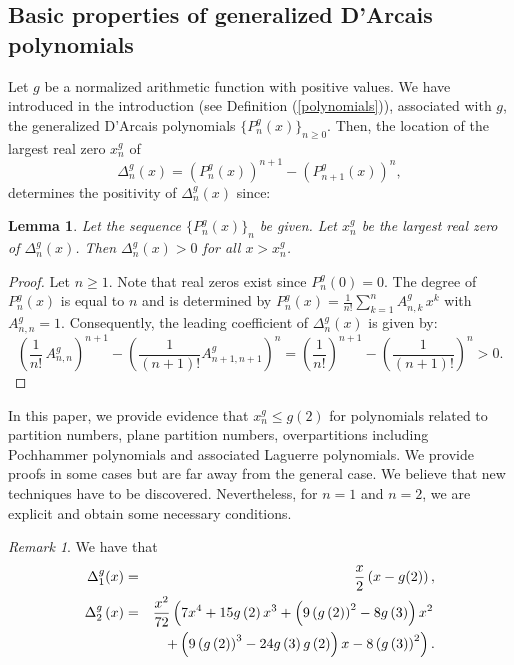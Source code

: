 \documentclass[11pt,reqno]{amsart}
\theoremstyle{plain}
\newtheorem{lemma}[theorem]{Lemma}
\theoremstyle{remark}
\newtheorem*{remark*}{Remark}
\theoremstyle{definition}
\numberwithin{equation}{section}
\begin{document}
\subsection{Basic
properties of
generalized D'Arcais
polynomials}
Let $g$ be a normalized arithmetic function with positive values.
We have introduced in the
introduction (see Definition (\ref{polynomials})),
associated with
$g$, the generalized D'Arcais polynomials $\{P_n^g(x)\}_{n\geq 0}$.
Then, the location of the largest real zero $x_n^g$ of
%
%
\begin{equation*}
\Delta_n^g(x)= \left(P_n^g(x)\right)^{n+1}-\left(P_{n+1}^g(x)\right)^n,
\end{equation*}
determines the positivity of $\Delta_n^g(x)$ since:
\begin{lemma}\label{lemma:largest}
Let the sequence $\{P_n^g(x)\}_n$ be given. Let $x_n^g$ be the largest real zero of $\Delta_n^g(x)$. Then $\Delta
_{n}^{g}\left( x
\right) >0$ for all $x > x_n^g$.
\end{lemma}
\begin{proof}
Let $n \geq 1$.
Note that real
zeros exist
since $P_n^g(0)=0$. The degree of $P_n^g(x)$ is equal to $n$ and is
determined by $P_n^g(x) = \frac{1}{n!}\sum_{k=1}^n A_{n,k}^g \, x^k$ with $A_{n,n}^g=1$.
Consequently, the leading coefficient of $\Delta_n^g(x)$ is given by:
\begin{equation*}
\left( \frac{1}{n!} \, A_{n,n}^{g} \right) ^{n+1}-\left( \frac{1}{\left( n+1\right) !}A_{n+1,n+1}^{g}\right) ^{n}=
\left(\frac{1}{n!}\right)^{n+1} - \left(\frac{1}{(n+1)!}\right)^n>0.
\end{equation*}
\end{proof}
In this paper, we provide evidence that
$x_n^g \leq g(2)$ for polynomials related to partition numbers, plane partition numbers, overpartitions including
Pochhammer polynomials and associated Laguerre polynomials. We provide proofs in some cases but are far away from the general case. We believe that new techniques have to be discovered.
Nevertheless, for $n=1$ and $n=2$, we are explicit and obtain some necessary conditions.
\begin{remark*}
We have that 
\begin{eqnarray*}
\Delta_1^g(x) &=& \frac{x}{2} \left( x
- g(2)\right) ,\\
\Delta _{2}^{g}\left( x\right) & = &\frac{x^{2}}{72}\left( 7\*x^4
 + 15\*g\left( 2\right) \*x^3
 + \left(9\*\left( g
 \left( 2
 \right) \right) ^2
 - 8\*g\left( 3\right) \right) \*x^2 \right.\\
&&\left. + \left(9\*\left( g
 \left( 2
 \right) \right) ^3
 - 24\*g
 \left( 3\right)
 \*g
 \left( 2\right)
 \right) \*x
 - 8\*\left( g
 \left( 3\right)
 \right) ^2\right). 
 \end{eqnarray*}
\end{remark*}
\end{document}
